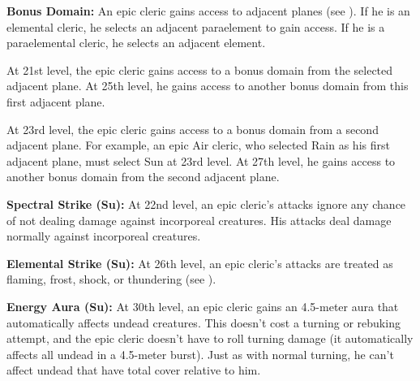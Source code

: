 \textbf{Bonus Domain:} An epic cleric gains access to adjacent planes (see ). If he is an elemental cleric, he selects an adjacent paraelement to gain access. If he is a paraelemental cleric, he selects an adjacent element.

At 21st level, the epic cleric gains access to a bonus domain from the selected adjacent plane. At 25th level, he gains access to another bonus domain from this first adjacent plane.

At 23rd level, the epic cleric gains access to a bonus domain from a second adjacent plane. For example, an epic Air cleric, who selected Rain as his first adjacent plane, must select Sun at 23rd level. At 27th level, he gains access to another bonus domain from the second adjacent plane.


\textbf{Spectral Strike (Su):} At 22nd level, an epic cleric's attacks ignore any chance of not dealing damage against incorporeal creatures. His attacks deal damage normally against incorporeal creatures.

\textbf{Elemental Strike (Su):} At 26th level, an epic cleric's attacks are treated as flaming, frost, shock, or thundering (see ).


\textbf{Energy Aura (Su):} At 30th level, an epic cleric gains an 4.5-meter aura that automatically affects undead creatures. This doesn't cost a turning or rebuking attempt, and the epic cleric doesn't have to roll turning damage (it automatically affects all undead in a 4.5-meter burst). Just as with normal turning, he can't affect undead that have total cover relative to him.

